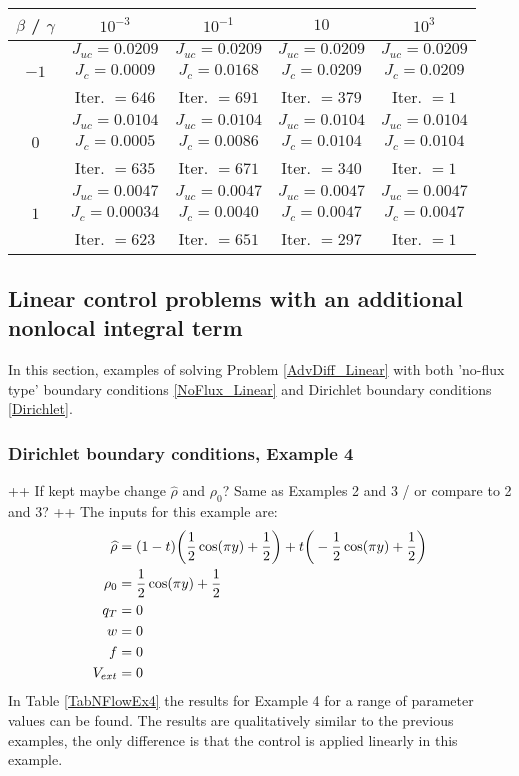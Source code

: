 \begin{table}
	\begin{tabular}{ ||c|| c | c |c | c ||}
		\hline
		$\beta$ / $\gamma$ & $10^{-3}$  & $10^{-1}$  & $10$ & $10^3$ \\ 
		\hline 
		& $J_{uc} = 0.0209$ & $J_{uc} = 0.0209$  & $J_{uc} = 0.0209$ & $J_{uc} = 0.0209$\\ 
		$-1$ & $J_c = 0.0009$ & $J_c = 0.0168$ & $J_c = 0.0209$ & $J_c = 0.0209$\\ 
		& Iter. $= 646$ & Iter. $= 691$  & Iter. $= 379$ & Iter. $= 1$\\ 
		\hline
		& $J_{uc} = 0.0104$ & $J_{uc} = 0.0104$  & $J_{uc} = 0.0104$& $J_{uc} = 0.0104$\\
		$0$  & $J_c = 0.0005$ & $J_c = 0.0086$  & $J_c = 0.0104$ & $J_c = 0.0104$\\ 
		& Iter. $= 635$ & Iter. $= 671$  & Iter. $= 340$ & Iter. $= 1$\\ 
		\hline
		& $J_{uc} = 0.0047$ & $J_{uc} = 0.0047$  & $J_{uc} = 0.0047$ & $J_{uc} = 0.0047$\\
		$1$  & $J_c = 0.00034$ & $J_c = 0.0040$  & $J_c = 0.0047$ & $J_c = 0.0047$\\ 
		& Iter. $= 623$ & Iter. $= 651$  & Iter. $= 297$ & Iter. $= 1$\\ 
		\hline 
	\end{tabular}
	\caption{}
	\label{TabNFlowAddEx2}
\end{table}



\subsection{Linear control problems with an additional nonlocal integral term}
In this section, examples of solving Problem \eqref{AdvDiff_Linear} with both 'no-flux type' boundary conditions \eqref{NoFlux_Linear} and Dirichlet boundary conditions \eqref{Dirichlet}.
\subsubsection{Dirichlet boundary conditions, Example 4}
++ If kept maybe change $\widehat \rho$ and $\rho_0$? Same as Examples 2 and 3 / or compare to 2 and 3? ++
The inputs for this example are:
\begin{align*}
\widehat \rho &= (1 - t)\bigg(\frac{1}{2}\cos(\pi y) + \frac{1}{2}\bigg)  + t\bigg(-\frac{1}{2}\cos(\pi y) + \frac{1}{2}\bigg)\\
\rho_{0} &= \frac{1}{2}\cos(\pi y) + \frac{1}{2}\\
q_{T} &= 0\\
{w} &= 0\\
f &=0\\
V_{ext} &=0
\end{align*}
In Table \ref{TabNFlowEx4} the results for Example 4 for a range of parameter values can be found. The results are qualitatively similar to the previous examples, the only difference is that the control is applied linearly in this example.

